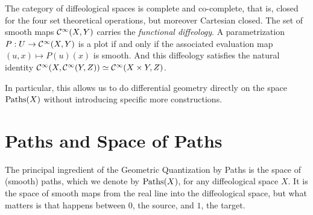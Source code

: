   \begin{article}
    \label{subsec:Functional Diffeology}
    The category of diffeological spaces is complete and co-complete,
    that is,
    closed for the four set theoretical operations,
    but moreover Cartesian closed.
    The set of smooth maps ${\mathcal{C}}^\infty(X, Y)$ carries the \emph{functional diffeology}.
    A parametrization $P: U \to {\mathcal{C}}^\infty(X, Y)$ is a plot if and only if the associated evaluation map $(u, x) \mapsto P(u)(x)$ is smooth.
    And this diffeology satisfies the natural identity ${\mathcal{C}}^\infty(X,{\mathcal{C}}^\infty(Y,Z)) \simeq {\mathcal{C}}^\infty(X \times Y,Z)$.
    
    In particular,
    this allows us to do differential geometry directly on the space $\operatorname{Paths}(X)$ without introducing specific more constructions.
  \end{article}
  
  \section{Paths and Space of Paths}
  \label{sec:Paths and Space of Paths}
  
  The principal ingredient of the Geometric Quantization by Paths is the space of (smooth) paths,
  which we denote by $\operatorname{Paths}(X)$,
  for any diffeological space $X$.
  It is the space of smooth maps from the real line into the diffeological space,
  but what matters is that happens between $0$,
  the source,
  and $1$,
  the target.
  
